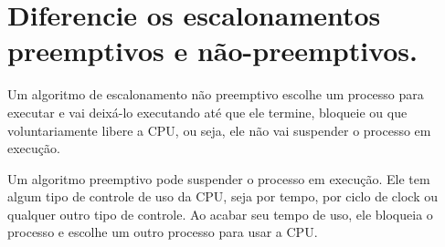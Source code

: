 \section{
    Diferencie os escalonamentos preemptivos e não-preemptivos.
}

\setlength{\parindent}{4em}
\setlength{\parskip}{0.5em}
\renewcommand{\baselinestretch}{1}


Um algoritmo de escalonamento não preemptivo escolhe um processo para executar e vai deixá-lo executando até que ele termine, bloqueie ou que voluntariamente libere a CPU, ou seja, ele não vai suspender o processo em execução.

Um algoritmo preemptivo pode suspender o processo em execução. Ele tem algum tipo de controle de uso da CPU, seja por tempo, por ciclo de clock ou qualquer outro tipo de controle. Ao acabar seu tempo de uso, ele bloqueia o processo e escolhe um outro processo para usar a CPU.